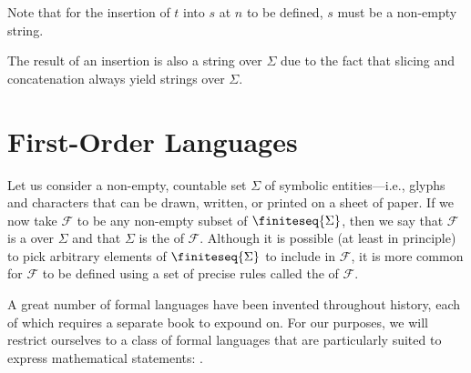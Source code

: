 \begin{rem}
    Note that for the insertion of \( t \) into \( s \) at \( n \) to be defined, \( s \) must be a non-empty string.
\end{rem}

\begin{cor}
     \label{cor:metatheory-the-insertion-of-a-string-into-another-string-is-also-a-string}
    The result of an insertion is also a string over \( \Sigma \) due to the fact that slicing and concatenation always yield strings over \( \Sigma \).
\end{cor}

\newpage
\section{First-Order Languages}
Let us consider a non-empty, countable set \( \Sigma \) of symbolic entities---i.e., glyphs and characters that can be drawn, written, or printed
on a sheet of paper.
If we now take \( \mathcal{F} \) to be any non-empty subset of \( \finiteseq{\Sigma} \), then we say that \( \mathcal{F} \) is a  over \( \Sigma \)
and that \( \Sigma \) is the  of \( \mathcal{F} \).
Although it is possible (at least in principle) to pick arbitrary elements of \( \finiteseq{\Sigma} \) to include in \( \mathcal{F} \), it is more common for
\( \mathcal{F} \) to be defined using a set of precise rules called the  of \( \mathcal{F} \).

\vspace{0.3cm}
\noindent
A great number of formal languages have been invented throughout history, each of which requires a separate book to expound on.
For our purposes, we will restrict ourselves to a class of formal languages that are particularly suited to express mathematical statements: .

